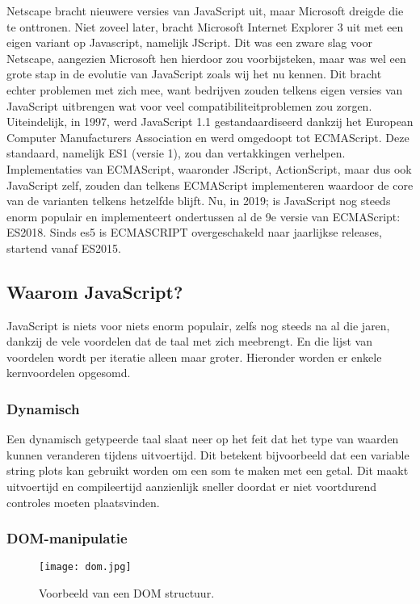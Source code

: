 Netscape bracht nieuwere versies van JavaScript uit, maar Microsoft dreigde die te onttronen. Niet zoveel later, bracht Microsoft Internet Explorer 3 uit met een eigen variant op Javascript, namelijk JScript. Dit was een zware slag voor Netscape, aangezien Microsoft hen hierdoor zou voorbijsteken, maar was wel een grote stap in de evolutie van JavaScript zoals wij het nu kennen. Dit bracht echter problemen met zich mee, want bedrijven zouden telkens eigen versies van JavaScript uitbrengen wat voor veel compatibiliteitproblemen zou zorgen. Uiteindelijk, in 1997, werd JavaScript 1.1 gestandaardiseerd dankzij het European Computer Manufacturers Association en werd omgedoopt tot ECMAScript. \autocite{Wiley2016} Deze standaard, namelijk ES1 (versie 1), zou dan vertakkingen verhelpen. Implementaties van ECMAScript, waaronder JScript, ActionScript, maar dus ook JavaScript zelf, zouden dan telkens ECMAScript implementeren waardoor de core van de varianten telkens hetzelfde blijft. Nu, in 2019; is JavaScript nog steeds enorm populair en implementeert ondertussen al de 9e versie van ECMAScript: ES2018. Sinds es5 is ECMASCRIPT overgeschakeld naar jaarlijkse releases, startend vanaf ES2015.

\subsection{Waarom JavaScript?}
\label{sec:jsWhy}

JavaScript is niets voor niets enorm populair, zelfs nog steeds na al die jaren, dankzij de vele voordelen dat de taal met zich meebrengt. En die lijst van voordelen wordt per iteratie alleen maar groter. Hieronder worden er enkele kernvoordelen opgesomd.

\subsubsection{Dynamisch}
\label{sec:dynamic}

Een dynamisch getypeerde taal slaat neer op het feit dat het type van waarden kunnen veranderen tijdens uitvoertijd. Dit betekent bijvoorbeeld dat een variable string plots kan gebruikt worden om een som te maken met een getal. Dit maakt uitvoertijd en compileertijd aanzienlijk sneller doordat er niet voortdurend controles moeten plaatsvinden. 

\subsubsection{DOM-manipulatie}
\label{sec:DOM}
\begin{figure}
	\texttt{[image: dom.jpg]}
	\caption{Voorbeeld van een DOM structuur.}
	\label{fig:dom}
\end{figure}

